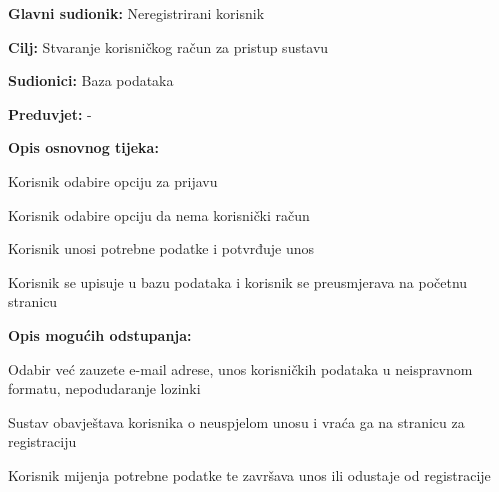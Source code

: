 \noindent {}
\begin{packed_item}

	\item \textbf{Glavni sudionik: }Neregistrirani korisnik
	\item  \textbf{Cilj:} Stvaranje korisničkog račun za pristup sustavu
	\item  \textbf{Sudionici:} Baza podataka
	\item  \textbf{Preduvjet:} -
	\item  \textbf{Opis osnovnog tijeka:}

	\item[] \begin{packed_enum}

		\item Korisnik odabire opciju za prijavu
		\item Korisnik odabire opciju da nema korisnički račun
		\item Korisnik unosi potrebne podatke i potvrđuje unos
		\item Korisnik se upisuje u bazu podataka i korisnik se preusmjerava na početnu stranicu
	\end{packed_enum}

	\item  \textbf{Opis mogućih odstupanja:}

	\item[] \begin{packed_item}

		\item[3.a] Odabir već zauzete e-mail adrese, unos korisničkih podataka u neispravnom formatu, nepodudaranje lozinki
		\item[] \begin{packed_enum}

			\item Sustav obavještava korisnika o neuspjelom unosu i vraća ga na stranicu za registraciju
			\item Korisnik mijenja potrebne podatke te završava unos ili odustaje od registracije

		\end{packed_enum}
	\end{packed_item}
\end{packed_item}

